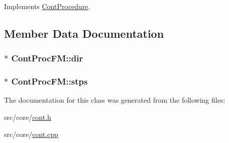 Implements \hyperlink{a00067_a7f7adefe250a00b3778669ef649f03ac}{Cont\-Procedure}.



\subsection{Member Data Documentation}
\hypertarget{a00070_a2a5343eff6f4bb803adf4adb9e222e12}{
\subsubsection[{dir}]{ $\ast$ Cont\-Proc\-F\-M\-::dir\hspace{0.3cm}{\ttfamily [private]}}}\label{a00070_a2a5343eff6f4bb803adf4adb9e222e12}
\hypertarget{a00070_aeb044fa5c2acb27c72c017fcd41d09ce}{
\subsubsection[{stps}]{$\ast$ Cont\-Proc\-F\-M\-::stps\hspace{0.3cm}{\ttfamily [private]}}}\label{a00070_aeb044fa5c2acb27c72c017fcd41d09ce}


The documentation for this class was generated from the following files\-:\begin{DoxyCompactItemize}
\item 
src/core/\hyperlink{a00218}{cont.\-h}\item 
src/core/\hyperlink{a00217}{cont.\-cpp}\end{DoxyCompactItemize}
